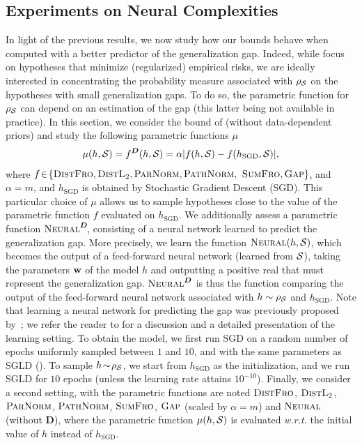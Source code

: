 \documentclass[twoside]{article}
\theoremstyle{plain}
\begin{document}
\subsection{Experiments on Neural Complexities}
\label{sec:experiments-neural-comp}
In light of the previous results, we now study how our bounds behave when computed with a better predictor of the generalization gap.
Indeed, while  focus on hypotheses that minimize (regularized) empirical risks, we are ideally interested in concentrating the probability measure associated with $\rho_{\mathcal{S}}$ on the hypotheses with small generalization gaps.
To do so, the parametric function for $\rho_{\mathcal{S}}$ can depend on an estimation of the gap (this latter being not available in practice). 
In this section, we consider the bound of  (without data-dependent priors) and study the following parametric functions $\mu$
\begin{align*}
\mu(h,\mathcal{S}) = f^{\boldsymbol{D}}(h,\mathcal{S}) = \alpha\vert f(h,\mathcal{S}) - f(h_{\text{SGD}},\mathcal{S})\vert,
\end{align*}
where $f\! \in\! \{\text{\sc DistFro}, \text{\sc DistL$_2$}, \text{\sc ParNorm}, \text{\sc PathNorm},$ $\text{\sc SumFro}, \text{\sc Gap}\}$, and $\alpha\!=\!m$, and  $h_{\text{SGD}}$ is obtained by Stochastic Gradient Descent (SGD).
This particular choice of $\mu$ allows us to sample hypotheses close to the value of the parametric function $f$ evaluated on $h_{\text{SGD}}$.
We additionally assess a parametric function $\text{\sc Neural}^{\boldsymbol{D}}\!$, consisting of a neural network learned to predict the generalization gap.
More precisely, we learn the function $\text{\sc Neural}(h,\mathcal{S})$, which becomes the output of a feed-forward neural network (learned from $\mathcal{S}$), taking the parameters $\mathbf{w}$ of the model $h$ and outputting a positive real that must represent the generalization gap.
$\text{\sc Neural}^{\boldsymbol{D}}$ is thus the function comparing the output of the feed-forward neural network associated with $h\sim\rho_{\mathcal{S}}$ and $h_{\text{SGD}}$.
Note that learning a neural network for predicting the gap was previously proposed by~\citep{lee2020neural}; we refer the reader to  for a discussion and a detailed presentation of the learning setting.
To obtain the model, we first run SGD on a random number of epochs uniformly sampled between $1$ and $10$, and with the same parameters as SGLD ().
To sample $h\!\sim\!\rho_{\mathcal{S}}$, we start from $h_{\text{SGD}}$ as the initialization, and we run SGLD for $10$ epochs (unless the learning rate attains $10^{-10}$).
Finally, we consider a second setting, with the parametric functions are noted $\text{\sc DistFro}$, $\text{\sc DistL$_2$}$, $\text{\sc ParNorm}$, $\text{\sc PathNorm}$, $\text{\sc SumFro}$, $\text{\sc Gap}$ (scaled by $\alpha\!=\!m$) and $\text{\sc Neural}$ (without $\boldsymbol{D}$), where the parametric function $\operatorname{\mu}(h, \mathcal{S})$ is evaluated \textit{w.r.t.} the initial value of $h$ instead of $h_{\text{SGD}}$.
\end{document}
